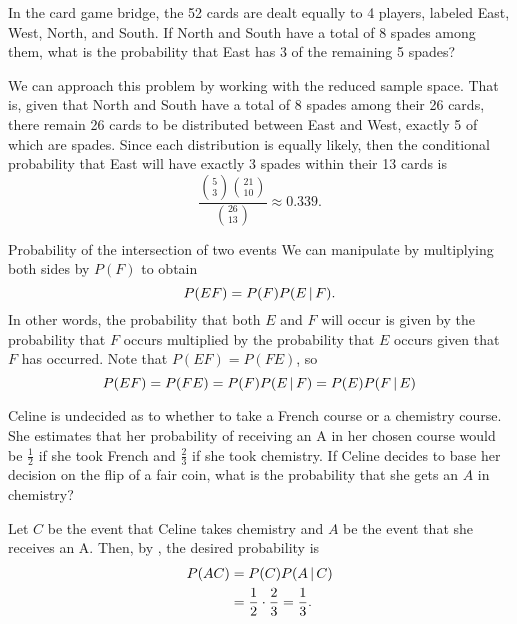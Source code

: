 \begin{changebar}
\begin{example}\label{bridgeex}
    In the card game bridge, the 52 cards are dealt equally to 4 players, labeled East, West, North, and South. If North and South have a total of 8 spades among them, what is the probability that East has 3 of the remaining 5 spades?
\end{example}
\begin{solution}
    We can approach this problem by working with the reduced sample space. That is, given that North and South have a total of 8 spades among their 26 cards, there remain 26 cards to be distributed between East and West, exactly 5 of which are spades. Since each distribution is equally likely, then the conditional probability that East will have exactly 3 spades within their 13 cards is \[
        \frac{{5 \choose 3}{21 \choose 10}}{{26 \choose 13}} \approx 0.339.    
    \] 
\end{solution}
\end{changebar}

\begin{bdef}{Probability of the intersection of two events}\label{probint}
    We can manipulate  by multiplying both sides by $P(F)$ to obtain \[
        P(EF) = P(F)P(E \,\vert\, F).    
    \]
    In other words, the probability that both $E$ and $F$ will occur is given by the probability that $F$ occurs multiplied by the probability that $E$ occurs given that $F$ has occurred. Note that $P(EF) = P(FE)$, so \[
        P(EF) = P(FE) = P(F)P(E \,\vert\, F) = P(E)P(F \,\vert\, E)    
    \]
\end{bdef}

\begin{changebar}
    \begin{example}
        Celine is undecided as to whether to take a French course or a chemistry course. She estimates that her probability of receiving an A in her chosen course would be $\frac{1}{2}$ if she took French and $\frac{2}{3}$ if she took chemistry. If Celine decides to base her decision on the flip of a fair coin, what is the probability that she gets an $A$ in chemistry?
    \end{example}
    \begin{solution}
        Let $C$ be the event that Celine takes chemistry and $A$ be the event that she receives an A. Then, by , the desired probability is \[
            \begin{aligned}
                P(AC) &= P(C)P(A \,\vert\, C) \\
                &= \frac{1}{2}\cdot\frac{2}{3} = \frac{1}{3}.
            \end{aligned}
        \]
    \end{solution}
\end{changebar}

